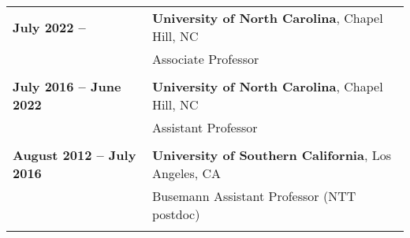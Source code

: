 \documentclass[10pt]{article}
\begin{document}
\smallskip

{
\begin{tabular}{l l}
{\bf July 2022 -- } & {\bf University of North Carolina}, Chapel Hill, NC \\
& {Associate Professor}\\ \\

{\bf July 2016 -- June 2022} & {\bf University of North Carolina}, Chapel Hill, NC \\
& {Assistant Professor}\\ \\

{\bf August 2012 -- July 2016} & {\bf University of Southern California}, Los Angeles, CA \\
& {Busemann Assistant Professor (NTT postdoc)}\\
\\
\end{tabular}
}


%
%
%
\end{document}
